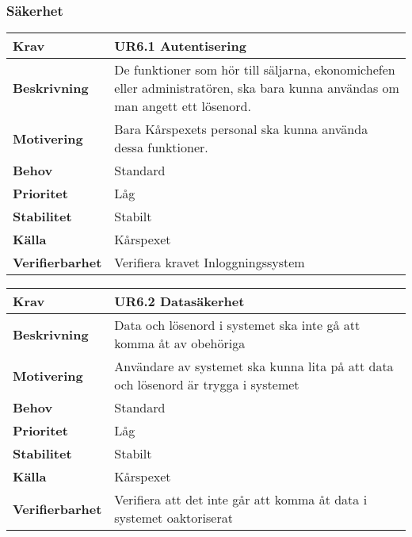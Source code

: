 \documentclass[a4paper, twoside, 11pt, titlepage]{article}
\begin{document}
		\subsubsection{Säkerhet}


		\begin{tabular} { p{2.6cm} p{12.5cm} }
			\hline
			\sffamily\textbf{Krav} & \sffamily\textbf{UR6.1 Autentisering } \\
			\hline
			\sffamily\textbf{Beskrivning} & De funktioner som hör till säljarna, ekonomichefen eller administratören, ska bara kunna användas om man angett ett lösenord.  \\
			\hline
			\sffamily\textbf{Motivering} & Bara Kårspexets personal ska kunna använda dessa funktioner.  \\
			\hline
			\sffamily\textbf{Behov} & Standard  \\
			\hline
			\sffamily\textbf{Prioritet} & Låg  \\
			\hline
			\sffamily\textbf{Stabilitet} & Stabilt  \\
			\hline
			\sffamily\textbf{Källa} & Kårspexet  \\
			\hline
			\sffamily\textbf{Verifierbarhet} & Verifiera kravet Inloggningssystem  \\
			\hline
		\end{tabular}
		\vspace{6mm}

		\begin{tabular} { p{2.6cm} p{12.5cm} }
			\hline
			\sffamily\textbf{Krav} & \sffamily\textbf{UR6.2 Datasäkerhet } \\
			\hline
			\sffamily\textbf{Beskrivning} & Data och lösenord i systemet ska inte gå att komma åt av obehöriga  \\
			\hline
			\sffamily\textbf{Motivering} & Användare av systemet ska kunna lita på att data och lösenord är trygga i systemet  \\
			\hline
			\sffamily\textbf{Behov} & Standard  \\
			\hline
			\sffamily\textbf{Prioritet} & Låg  \\
			\hline
			\sffamily\textbf{Stabilitet} & Stabilt  \\
			\hline
			\sffamily\textbf{Källa} & Kårspexet  \\
			\hline
			\sffamily\textbf{Verifierbarhet} & Verifiera att det inte går att komma åt data i systemet oaktoriserat  \\
			\hline
		\end{tabular}
\end{document}
